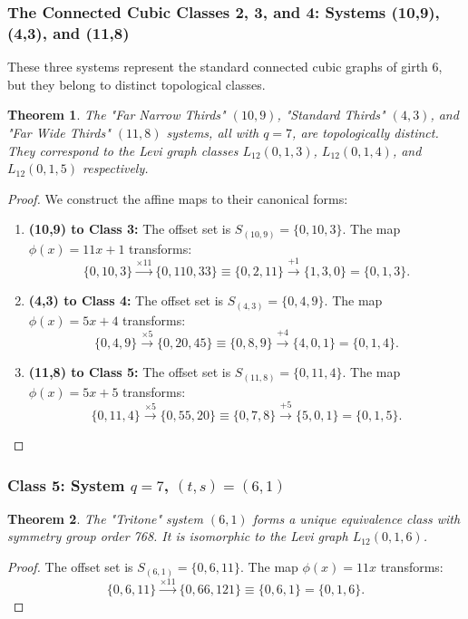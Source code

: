 \documentclass[12pt,letterpaper]{amsart}
\newtheorem{theorem}{Theorem}
\begin{document}
\subsubsection{The Connected Cubic Classes 2, 3, and 4: Systems (10,9), (4,3), and (11,8)}

These three systems represent the standard connected cubic graphs of girth 6, but they belong to distinct topological classes.

\begin{theorem}
The "Far Narrow Thirds" $(10,9)$, "Standard Thirds" $(4,3)$, and "Far Wide Thirds" $(11,8)$ systems, all with $q=7$, are topologically distinct. They correspond to the Levi graph classes $L_{12}(0,1,3)$, $L_{12}(0,1,4)$, and $L_{12}(0,1,5)$ respectively.
\end{theorem}

\begin{proof}
We construct the affine maps to their canonical forms:
\begin{enumerate}
    \item \textbf{(10,9) to Class 3:} The offset set is $S_{(10,9)} = \{0, 10, 3\}$. The map $\phi(x) = 11x+1$ transforms:
    \[ \{0, 10, 3\} \xrightarrow{\times 11} \{0, 110, 33\} \equiv \{0, 2, 11\}\xrightarrow{+ 1} \{1,3,0\}= \{0,1,3\} . \]
    \item \textbf{(4,3) to Class 4:} The offset set is $S_{(4,3)} = \{0, 4, 9\}$. The map $\phi(x) = 5x+4$ transforms:
    \[ \{0, 4, 9\} \xrightarrow{\times 5} \{0, 20, 45\} \equiv \{0, 8, 9\} \xrightarrow{+4} \{4, 0, 1\} = \{0, 1, 4\}. \]
    \item \textbf{(11,8) to Class 5:} The offset set is $S_{(11,8)} = \{0, 11, 4\}$. The map $\phi(x) = 5x+5$ transforms:
    \[ \{0, 11, 4\} \xrightarrow{\times 5} \{0, 55, 20\} \equiv \{0, 7, 8\}\xrightarrow{+ 5}\{5,0,1\}=\{0,1,5\}. \]
\end{enumerate}
\end{proof}

\subsubsection{Class 5: System $q=7$, $(t,s)=(6,1)$}

\begin{theorem}
The "Tritone" system $(6,1)$ forms a unique equivalence class with symmetry group order 768. It is isomorphic to the Levi graph $L_{12}(0,1,6)$.
\end{theorem}

\begin{proof}
The offset set is $S_{(6,1)} = \{0, 6, 11\}$. The map $\phi(x) = 11x$ transforms:
\[ \{0, 6, 11\} \xrightarrow{\times 11} \{0, 66, 121\} \equiv \{0, 6, 1\} = \{0, 1, 6\}. \]
\end{proof}
\end{document}
